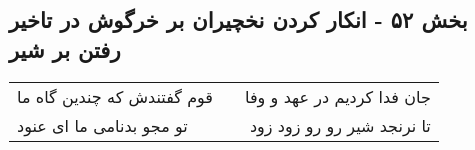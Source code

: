\begin{center}
\section*{بخش ۵۲ - انکار کردن نخچیران بر خرگوش در تاخیر رفتن بر شیر}
\label{sec:sh052}
\begin{longtable}{l p{0.5cm} r}
قوم گفتندش که چندین گاه ما
&&
جان فدا کردیم در عهد و وفا
\\
تو مجو بدنامی ما ای عنود
&&
تا نرنجد شیر رو رو زود زود
\\
\end{longtable}
\end{center}
